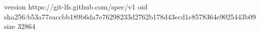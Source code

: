 version https://git-lfs.github.com/spec/v1
oid sha256:b53a77eaccbb189b6da7e76298233d2762b178d43ecd1c8578364e9025443b09
size 32864
